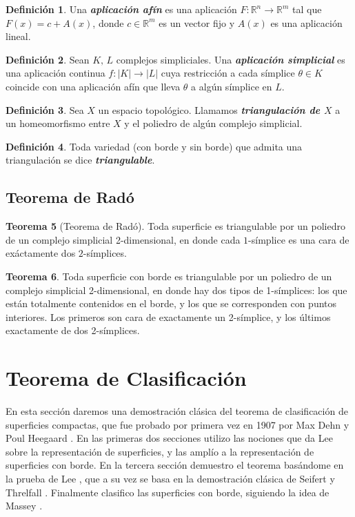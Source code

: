 \documentclass[10pt]{report}
\newcommand{\R}{\mathbb{R}}
\newcommand{\enfatiza}[1]{\textbf{\textit{#1}}}
\theoremstyle{definition}
\newtheorem{defin}{Definición}[section]
\newtheorem{tma}[defin]{Teorema}
\begin{document}
\begin{defin}
Una \enfatiza{aplicación afín} es una aplicación $F:\R^n \to \R^m$ tal que $F(x)=c+A(x)$, donde $c\in \R^m$ es un vector fijo y $A(x)$ es una aplicación lineal.
\end{defin}
\begin{defin}
Sean $K, \, L$ complejos simpliciales. Una \enfatiza{aplicación simplicial} es una aplicación continua $f:|K|\to |L|$ cuya restricción a cada símplice $\theta \in K$ coincide con una aplicación afín que lleva $\theta$ a algún símplice en $L$.
\end{defin}
\begin{defin}%
Sea $X$ un espacio topológico. Llamamos \enfatiza{triangulación de $X$} a un homeomorfismo entre $X$ y el poliedro de algún complejo simplicial.
\end{defin}

\begin{defin}%
Toda variedad (con borde y sin borde) que admita una triangulación se dice \enfatiza{triangulable}.
\end{defin}



\section{Teorema de Radó}

\begin{tma}[Teorema de Radó]
Toda superficie es triangulable por un poliedro de un complejo simplicial 2-dimensional, en donde cada $1$-símplice es una cara de exáctamente dos $2$-símplices.\label{teo:rado}
\end{tma}

\begin{tma}
Toda superficie con borde es triangulable por un poliedro de un complejo simplicial 2-dimensional, en donde hay dos tipos de 1-símplices: los que están totalmente contenidos en el borde, y los que se corresponden con puntos interiores. Los primeros son cara de exactamente un 2-símplice, y los últimos exactamente de dos 2-símplices.
\end{tma}

\clearpage

\chapter{Teorema de Clasificación}
En esta sección daremos una demostración clásica del teorema de clasificación de superficies compactas, que fue probado por primera vez en 1907 por Max Dehn y Poul Heegaard \cite{dehn}. En las primeras dos secciones utilizo las nociones que da Lee \cite{lee1} sobre la representación de superficies, y las amplío a la representación de superficies con borde. En la tercera sección demuestro el teorema basándome en la prueba de Lee \cite{lee1}, que a su vez se basa en la demostración clásica de Seifert y Threlfall \cite{seifert}. Finalmente clasifico las superficies con borde, siguiendo la idea de Massey \cite{massey}.
\end{document}
